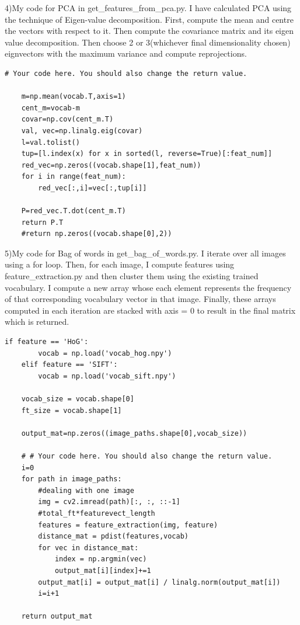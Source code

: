 4)My code for PCA in get\_features\_from\_pca.py. I have calculated PCA using the technique of Eigen-value decomposition. First, compute the mean and centre the vectors with respect to it. Then compute the covariance matrix and its eigen value decomposition. Then choose 2 or 3(whichever final dimensionality chosen) eignvectors with the maximum variance and compute reprojections.
\begin{lstlisting}[style=Matlab-editor]
# Your code here. You should also change the return value.

    m=np.mean(vocab.T,axis=1)
    cent_m=vocab-m
    covar=np.cov(cent_m.T)
    val, vec=np.linalg.eig(covar)
    l=val.tolist()
    tup=[l.index(x) for x in sorted(l, reverse=True)[:feat_num]]
    red_vec=np.zeros((vocab.shape[1],feat_num))
    for i in range(feat_num):
        red_vec[:,i]=vec[:,tup[i]]

    P=red_vec.T.dot(cent_m.T)
    return P.T
    #return np.zeros((vocab.shape[0],2))
\end{lstlisting}

5)My code for Bag of words in get\_bag\_of\_words.py. I iterate over all images using a for loop. Then, for each image, I compute features using feature\_extraction.py and then cluster them using the existing trained vocabulary. I compute a new array whose each element represents the frequency of that corresponding vocabulary vector in that image. Finally, these arrays computed in each iteration are stacked with axis = 0 to result in the final matrix which is returned.
\begin{lstlisting}[style=Matlab-editor]
    if feature == 'HoG':
        vocab = np.load('vocab_hog.npy')
    elif feature == 'SIFT':
        vocab = np.load('vocab_sift.npy')

    vocab_size = vocab.shape[0]
    ft_size = vocab.shape[1]

    output_mat=np.zeros((image_paths.shape[0],vocab_size))

    # # Your code here. You should also change the return value.
    i=0
    for path in image_paths:
        #dealing with one image
        img = cv2.imread(path)[:, :, ::-1]
        #total_ft*featurevect_length
        features = feature_extraction(img, feature)
        distance_mat = pdist(features,vocab)
        for vec in distance_mat:
            index = np.argmin(vec)
            output_mat[i][index]+=1
        output_mat[i] = output_mat[i] / linalg.norm(output_mat[i])
        i=i+1

    return output_mat
\end{lstlisting}

